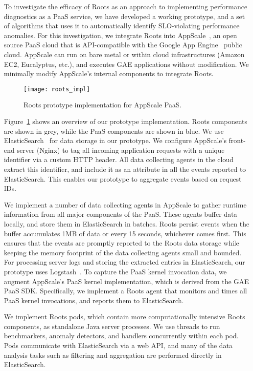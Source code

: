To investigate the efficacy of Roots as an approach to
implementing performance diagnostics as a PaaS service, we have developed a
working prototype, and a set of algorithms that uses it to automatically
identify SLO-violating performance anomalies.
For this investigation, we integrate Roots into AppScale~\cite{6488671}, an open source PaaS cloud
that is API-compatible with the Google App Engine~\cite{gae} public cloud.  
AppScale can run on bare metal or within cloud infrastructures (Amazon EC2, Eucalyptus, 
etc.), and executes GAE applications without modification.
We minimally modify AppScale's internal components to integrate Roots.

\begin{figure}
\centering
\texttt{[image: roots\_impl]}
\caption{Roots prototype implementation for AppScale PaaS.}
\label{fig:roots_impl}
\vspace{-0.1in}
\end{figure}

Figure~\ref{fig:roots_impl} shows an overview of our prototype implementation. Roots components
are shown in grey, while the PaaS components are shown in blue.
We use ElasticSearch~\cite{Kononenko:2014:MMR:2597073.2597091} for data storage in our prototype. 
We configure AppScale's front-end server (Nginx) to tag all incoming application requests
with a unique identifier via a custom HTTP header. 
All data collecting agents in the cloud extract this identifier, and include it as an attribute
in all the events reported to ElasticSearch. This enables our prototype to aggregate events based 
on request IDs.

We implement a number of data collecting agents in AppScale to gather runtime information
from all major components of the PaaS. These agents buffer data locally, and store them in ElasticSearch
in batches. Roots persist events when the buffer accumulates 1MB of data or every 15 seconds, whichever comes
first.  This ensures that the events are promptly reported to the Roots data
storage while keeping the memory footprint of the data collecting agents small and bounded. 
For processing server logs and storing the extracted entries in ElasticSearch,
our prototype uses Logstash~\cite{logstash}. 
To capture the PaaS kernel invocation data, we augment AppScale's PaaS kernel implementation,
which is derived from the GAE PaaS SDK. Specifically, we implement a Roots agent that monitors
and times all PaaS kernel invocations, and reports them to ElasticSearch. 

We implement Roots pods, which contain more computationally intensive Roots components, 
as standalone Java server processes. We use threads to run benchmarkers,
anomaly detectors, and handlers concurrently within each pod. Pods communicate with ElasticSearch via
a web API, and many of the data analysis tasks such as filtering and aggregation are performed
directly in ElasticSearch.

